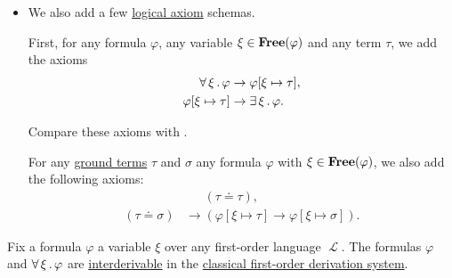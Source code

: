 \begin{proposition}
\begin{proposition}
\begin{definition}
\begin{itemize}
    \item We also add a few \hyperref[def:proof_derivation_system/axioms]{logical axiom} schemas.

    \begin{thmenum}[resume=def:first_order_derivation_system]
       First, for any formula \( \varphi \), any variable \( \xi \in \operatorname{\mathbf{Free}}(\varphi) \) and any term \( \tau \), we add the axioms
      \begin{align}
        \forall \thinspace \xi \thinspace . \thinspace \varphi      &\rightarrow \varphi[\xi \mapsto \tau], \label{eq:def:first_order_derivation_system/axioms/terms/forall_elim} \\
        \varphi[\xi \mapsto \tau] &\rightarrow \exists \thinspace \xi \thinspace . \thinspace \varphi.      \label{eq:def:first_order_derivation_system/axioms/terms/exists_intro}
      \end{align}

      Compare these axioms with .

       For any \hyperref[def:first_order_syntax/ground_term]{ground terms} \( \tau \) and \( \sigma \) any formula \( \varphi \) with \( \xi \in \operatorname{\mathbf{Free}}(\varphi) \), we also add the following axioms:
      \begin{align}
                             &\phantom{{}\rightarrow{}} (\tau \doteq \tau), \label{eq:def:first_order_derivation_system/axioms/equality/reflexivity} \\
        (\tau \doteq \sigma) &\rightarrow (\varphi[\xi \mapsto \tau] \rightarrow \varphi[\xi \mapsto \sigma]) \label{eq:def:first_order_derivation_system/axioms/equality/subst}.
      \end{align}
    \end{thmenum}
  \end{itemize}
\end{definition}

\begin{proposition}\label{thm:syntactic_implicit_universal_quantification}
  Fix a formula \( \varphi \) a variable \( \xi \) over any first-order language \( \mscrL \). The formulas \( \varphi \) and \( \forall \thinspace \xi \thinspace . \thinspace \varphi \) are \hyperref[def:derivation_system_derivability]{interderivable} in the \hyperref[def:first_order_derivation_system]{classical first-order derivation system}.


\end{proposition}
\end{proposition}
\end{proposition}
